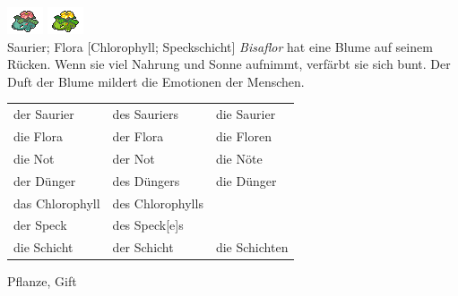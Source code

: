 \documentclass[a7paper,10pt,grid=front%
,toc
]{kartei}
\begin{document}
\begin{karte}[Notdünger]{
\includegraphics{../regular/venusaur}
\includegraphics{../shiny/venusaur} \\
Saurier; Flora
}[Chlorophyll; Speckschicht]
\emph{Bisaflor} hat eine Blume auf seinem Rücken. Wenn sie viel Nahrung und
Sonne aufnimmt, verfärbt sie sich bunt. Der Duft der Blume mildert die Emotionen
der Menschen.

\vspace{10pt}
\begin{tabular}{lll}
der Saurier & des Sauriers & die Saurier \\
die Flora & der Flora & die Floren \\
die Not & der Not & die Nöte \\
der Dünger & des Düngers & die Dünger \\
das Chlorophyll & des Chlorophylls & \\
der Speck & des Speck[e]s & \\
die Schicht & der Schicht & die Schichten \\
\end{tabular}
\vspace{10pt}

Pflanze, Gift
\end{karte}
\end{document}
